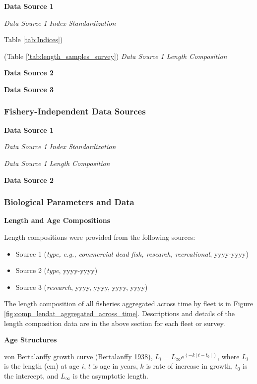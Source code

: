 \documentclass[12pt,]{article}
\begin{document}
\textbf{Data Source 1}

\emph{Data Source 1 Index Standardization}

Table \ref{tab:Indices})

(Table \ref{'tab:length_samples_survey}) \emph{Data Source 1 Length
Composition}

\textbf{Data Source 2}

\textbf{Data Source 3}

\subsubsection{Fishery-Independent Data
Sources}\label{fishery-independent-data-sources}

\textbf{Data Source 1}

\emph{Data Source 1 Index Standardization}

\emph{Data Source 1 Length Composition}

\textbf{Data Source 2}

\subsubsection{Biological Parameters and
Data}\label{biological-parameters-and-data}

\textbf{Length and Age Compositions}

Length compositions were provided from the following sources:

\begin{itemize}[noitemsep,nolistsep,topsep=0pt]
  \item Source 1 (\emph{type, e.g., commercial dead fish, research, recreational}, yyyy-yyyy)    
  \item Source 2 (\emph{type}, yyyy-yyyy)    
  \item Source 3 (\emph{research}, yyyy, yyyy, yyyy, yyyy) 
\end{itemize}

The length composition of all fisheries aggregated across time by fleet
is in Figure \ref{fig:comp_lendat_aggregated_across_time}. Descriptions
and details of the length composition data are in the above section for
each fleet or survey.

\vspace{.5cm} \textbf{Age Structures}

von Bertalanffy growth curve (Bertalanffy
\protect\hyperlink{ref-vonB1938}{1938}),
\(L_i = L_{\infty}e^{(-k[t-t_0])}\), where \(L_i\) is the length (cm) at
age \(i\), \(t\) is age in years, \(k\) is rate of increase in growth,
\(t_0\) is the intercept, and \(L_{\infty}\) is the asymptotic length.
\end{document}
